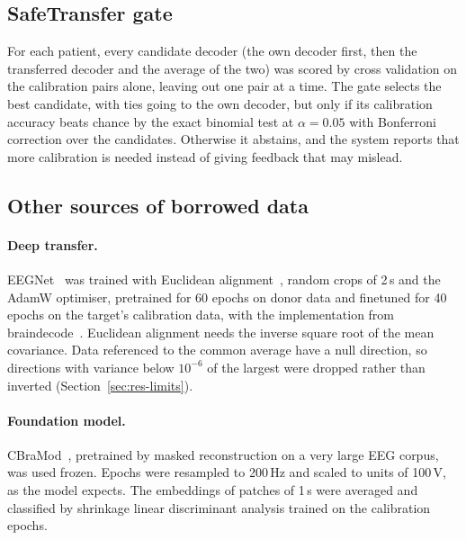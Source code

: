 \documentclass[pdflatex,sn-mathphys-num]{sn-jnl}
\begin{document}
\subsection{SafeTransfer gate}\label{sec:gate-method}

For each patient, every candidate decoder (the own decoder first, then the transferred decoder and the average of the two) was scored by cross validation on the calibration pairs alone, leaving out one pair at a time. The gate selects the best candidate, with ties going to the own decoder, but only if its calibration accuracy beats chance by the exact binomial test at $\alpha = 0.05$ with Bonferroni correction over the candidates. Otherwise it abstains, and the system reports that more calibration is needed instead of giving feedback that may mislead.

\subsection{Other sources of borrowed data}\label{sec:sources}

\paragraph{Deep transfer.} EEGNet~\cite{lawhern2018} was trained with Euclidean alignment~\cite{he2020}, random crops of 2\,s and the AdamW optimiser, pretrained for 60 epochs on donor data and finetuned for 40 epochs on the target's calibration data, with the implementation from braindecode~\cite{schirrmeister2017}. Euclidean alignment needs the inverse square root of the mean covariance. Data referenced to the common average have a null direction, so directions with variance below $10^{-6}$ of the largest were dropped rather than inverted (Section~\ref{sec:res-limits}).

\paragraph{Foundation model.} CBraMod~\cite{wang2025cbramod}, pretrained by masked reconstruction on a very large EEG corpus, was used frozen. Epochs were resampled to 200\,Hz and scaled to units of 100\,\textmu V, as the model expects. The embeddings of patches of 1\,s were averaged and classified by shrinkage linear discriminant analysis trained on the calibration epochs.
\end{document}
